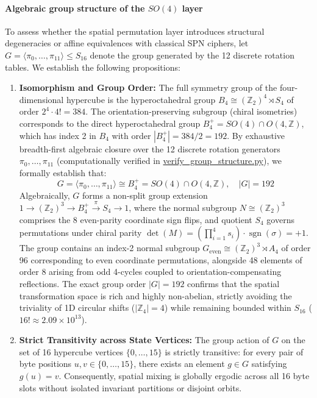 \documentclass[review,12pt]{elsarticle}
\begin{document}
\paragraph{Algebraic group structure of the $SO(4)$ layer}
To assess whether the spatial permutation layer introduces structural degeneracies or affine equivalences with classical SPN ciphers, let $G = \langle \pi_0, \dots, \pi_{11} \rangle \le S_{16}$ denote the group generated by the 12 discrete rotation tables. We establish the following propositions:
\begin{enumerate}
    \item \textbf{Isomorphism and Group Order:} The full symmetry group of the four-dimensional hypercube is the hyperoctahedral group $B_4 \cong (\mathbb{Z}_2)^4 \rtimes S_4$ of order $2^4 \cdot 4! = 384$. The orientation-preserving subgroup (chiral isometries) corresponds to the direct hyperoctahedral group $B_4^+ = SO(4) \cap O(4, \mathbb{Z})$, which has index 2 in $B_4$ with order $|B_4^+| = 384 / 2 = 192$. By exhaustive breadth-first algebraic closure over the 12 discrete rotation generators $\pi_0, \dots, \pi_{11}$ (computationally verified in \url{verify_group_structure.py}), we formally establish that:
    \begin{equation}
        G = \langle \pi_0, \dots, \pi_{11} \rangle \cong B_4^+ = SO(4) \cap O(4, \mathbb{Z}), \quad |G| = 192
    \end{equation}
    Algebraically, $G$ forms a non-split group extension $1 \to (\mathbb{Z}_2)^3 \to B_4^+ \xrightarrow{\pi} S_4 \to 1$, where the normal subgroup $N \cong (\mathbb{Z}_2)^3$ comprises the 8 even-parity coordinate sign flips, and quotient $S_4$ governs permutations under chiral parity $\det(M) = (\prod_{i=1}^4 s_i) \cdot \operatorname{sgn}(\sigma) = +1$. The group contains an index-2 normal subgroup $G_{\text{even}} \cong (\mathbb{Z}_2)^3 \rtimes A_4$ of order 96 corresponding to even coordinate permutations, alongside 48 elements of order 8 arising from odd 4-cycles coupled to orientation-compensating reflections. The exact group order $|G| = 192$ confirms that the spatial transformation space is rich and highly non-abelian, strictly avoiding the triviality of 1D circular shifts ($|\mathbb{Z}_4| = 4$) while remaining bounded within $S_{16}$ ($16! \approx 2.09 \times 10^{13}$).
    \item \textbf{Strict Transitivity across State Vertices:} The group action of $G$ on the set of 16 hypercube vertices $\{0, \dots, 15\}$ is strictly transitive: for every pair of byte positions $u, v \in \{0, \dots, 15\}$, there exists an element $g \in G$ satisfying $g(u) = v$. Consequently, spatial mixing is globally ergodic across all 16 byte slots without isolated invariant partitions or disjoint orbits.

\end{enumerate}
\end{document}
